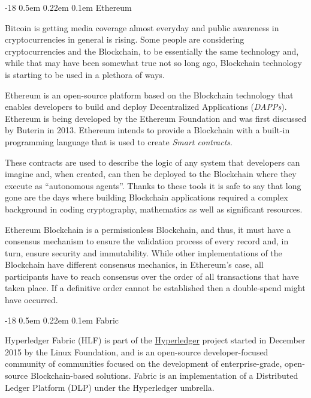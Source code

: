 \documentclass[]{llncs}
\makeatletter
\renewcommand\subsubsection{\@startsection{subsubsection}{3}{\z@}%
                       {-18\p@ \@plus -4\p@ \@minus -4\p@}%
                       {0.5em \@plus 0.22em \@minus 0.1em}%
                       {\normalfont\normalsize\bfseries\boldmath}}
\makeatother
\begin{document}
\subsubsection{Ethereum}

Bitcoin is getting media coverage almost everyday and public awareness in cryptocurrencies 
in general is rising. 
Some people are considering cryptocurrencies and the Blockchain, to be essentially the same 
technology and, while that may have been somewhat true not so long ago, Blockchain technology 
is starting to be used in a plethora of ways.

Ethereum is an open-source platform based on the Blockchain technology that enables developers 
to build and deploy Decentralized Applications (\textit{DAPPs}).
Ethereum is being developed by the Ethereum Foundation and was first discussed by Buterin in 2013. 
Ethereum intends to provide a Blockchain with a built-in programming language that is used to 
create \textit{Smart contracts}.
\cite{Wood2017}

These contracts are used to describe the logic of any system that developers can imagine and, 
when created, can then be deployed to the Blockchain where they execute as “autonomous agents”. 
Thanks to these tools it is safe to say that long gone are the days where building 
Blockchain applications required a complex background in coding cryptography, mathematics 
as well as significant resources.\cite{Wood2017,BlockGeeks2017}

Ethereum Blockchain is a permissionless Blockchain, and thus, it must have a consensus 
mechanism to ensure the validation process of every record and, in turn, ensure security 
and immutability. While other implementations of the Blockchain have different consensus mechanics, 
in Ethereum’s case, all participants have to reach consensus over the order of all transactions 
that have taken place. If a definitive order cannot be established then a double-spend might have occurred.

\subsubsection{Fabric}

Hyperledger Fabric (HLF) is part of the \href{http://www.hyperledger.org/projects/fabric}{Hyperledger} 
project started in December 2015 by the Linux Foundation, and is an open-source developer-focused 
community of communities focused on the development of enterprise-grade, open-source Blockchain-based solutions. 
Fabric is an implementation of a Distributed Ledger Platform (DLP) under the Hyperledger umbrella.
\cite{Cachin2016}
\end{document}
